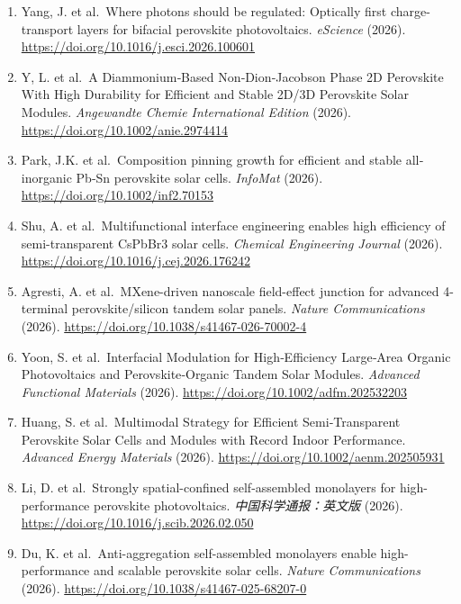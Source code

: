 \documentclass[
  11pt,
]{article}
\begin{document}
\begin{enumerate}
  Zhang, X. et al.~Vapour-assisted surface treatment: a breakthrough for
  printed carbon-based perovskite solar modules. \emph{DeCarbon} (2026).
  \url{https://doi.org/10.1016/j.decarb.2026.100161}
\item
  Yang, J. et al.~Where photons should be regulated: Optically first
  charge-transport layers for bifacial perovskite photovoltaics.
  \emph{eScience} (2026).
  \url{https://doi.org/10.1016/j.esci.2026.100601}
\item
  Y, L. et al.~A Diammonium‐Based Non‐Dion‐Jacobson Phase 2D Perovskite
  With High Durability for Efficient and Stable 2D/3D Perovskite Solar
  Modules. \emph{Angewandte Chemie International Edition} (2026).
  \url{https://doi.org/10.1002/anie.2974414}
\item
  Park, J.K. et al.~Composition pinning growth for efficient and stable
  all‐inorganic Pb‐Sn perovskite solar cells. \emph{InfoMat} (2026).
  \url{https://doi.org/10.1002/inf2.70153}
\item
  Shu, A. et al.~Multifunctional interface engineering enables high
  efficiency of semi-transparent CsPbBr3 solar cells. \emph{Chemical
  Engineering Journal} (2026).
  \url{https://doi.org/10.1016/j.cej.2026.176242}
\item
  Agresti, A. et al.~MXene-driven nanoscale field-effect junction for
  advanced 4-terminal perovskite/silicon tandem solar panels.
  \emph{Nature Communications} (2026).
  \url{https://doi.org/10.1038/s41467-026-70002-4}
\item
  Yoon, S. et al.~Interfacial Modulation for High‐Efficiency Large‐Area
  Organic Photovoltaics and Perovskite‐Organic Tandem Solar Modules.
  \emph{Advanced Functional Materials} (2026).
  \url{https://doi.org/10.1002/adfm.202532203}
\item
  Huang, S. et al.~Multimodal Strategy for Efficient Semi‐Transparent
  Perovskite Solar Cells and Modules with Record Indoor Performance.
  \emph{Advanced Energy Materials} (2026).
  \url{https://doi.org/10.1002/aenm.202505931}
\item
  Li, D. et al.~Strongly spatial-confined self-assembled monolayers for
  high-performance perovskite photovoltaics. \emph{中国科学通报：英文版}
  (2026). \url{https://doi.org/10.1016/j.scib.2026.02.050}
\item
  Du, K. et al.~Anti-aggregation self-assembled monolayers enable
  high-performance and scalable perovskite solar cells. \emph{Nature
  Communications} (2026).
  \url{https://doi.org/10.1038/s41467-025-68207-0}
\end{enumerate}
\end{document}
